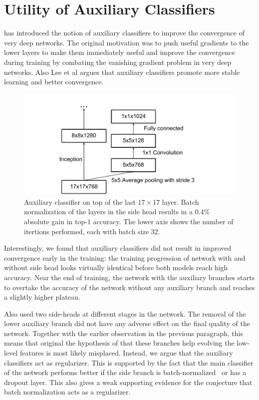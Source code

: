 \section{Utility of Auxiliary Classifiers}

\cite{szegedy2015going} has introduced the notion of auxiliary classifiers
to improve the convergence of very deep networks. The original motivation was
to push useful gradients to the lower layers to make them immediately
useful and improve the convergence during training by combating the
vanishing gradient problem in very deep networks. Also Lee et al\cite{lee2014deeply}
argues that auxiliary classifiers promote more stable learning and better
convergence.
\begin{figure}
\centering
\includegraphics[width=\linewidth]{sideheaddiag.pdf}
\caption{Auxiliary classifier on top of the last $17\times 17$ layer.
Batch normalization\cite{ioffe2015batch} of the layers in the side head
results in a $0.4\%$ absolute gain in top-$1$ accuracy. The lower axis shows
the number of itertions performed, each with batch size $32$.}
\label{fig:sidehead}
\end{figure}
Interestingly, we found that auxiliary classifiers did not result in improved
convergence early in the training: the training progression of network with
and without side head looks virtually identical before both models reach
high accuracy. Near the end of training, 
the network with the auxiliary branches starts to
overtake the accuracy of the network without any auxiliary branch and
reaches a slightly higher plateau.

Also \cite{szegedy2015going} used two side-heads at different stages in the
network. The removal of the lower auxiliary branch did not have any
adverse effect on the final quality of the network. Together with the
earlier observation in the previous paragraph, this means that
original the hypothesis of \cite{szegedy2015going} that these branches
help evolving the low-level features is most likely misplaced.
Instead, we argue that the auxiliary classifiers act as regularizer.
This is supported by the fact that the main classifier of the
network  performs better if the side branch is batch-normalized~\cite{ioffe2015batch}
or has a dropout layer. This also gives a weak supporting evidence for the
conjecture that batch normalization acts as a regularizer.
